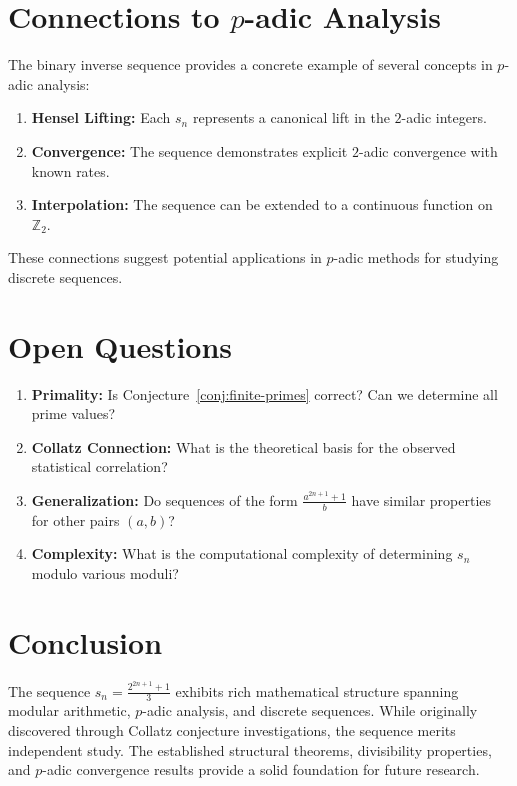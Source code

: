 \documentclass[11pt]{article}
\theoremstyle{definition}
\newcommand{\Z}{\mathbb{Z}}
\begin{document}
\section{Connections to $p$-adic Analysis}

The binary inverse sequence provides a concrete example of several concepts in $p$-adic analysis:
\begin{enumerate}
\item \textbf{Hensel Lifting:} Each $s_n$ represents a canonical lift in the $2$-adic integers.
\item \textbf{Convergence:} The sequence demonstrates explicit $2$-adic convergence with known rates.
\item \textbf{Interpolation:} The sequence can be extended to a continuous function on $\Z_2$.
\end{enumerate}

These connections suggest potential applications in $p$-adic methods for studying discrete sequences.

\section{Open Questions}

\begin{enumerate}
\item \textbf{Primality:} Is Conjecture~\ref{conj:finite-primes} correct? Can we determine all prime values?
\item \textbf{Collatz Connection:} What is the theoretical basis for the observed statistical correlation?
\item \textbf{Generalization:} Do sequences of the form $\frac{a^{2n+1} + 1}{b}$ have similar properties for other pairs $(a,b)$?
\item \textbf{Complexity:} What is the computational complexity of determining $s_n$ modulo various moduli?
\end{enumerate}

\section{Conclusion}

The sequence $s_n = \frac{2^{2n+1} + 1}{3}$ exhibits rich mathematical structure spanning modular arithmetic, $p$-adic analysis, and discrete sequences. While originally discovered through Collatz conjecture investigations, the sequence merits independent study. The established structural theorems, divisibility properties, and $p$-adic convergence results provide a solid foundation for future research.
\end{document}
